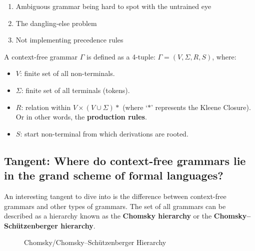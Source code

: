 \begin{enumerate}
    \item Ambiguous grammar being hard to spot with the untrained eye
    \item The dangling-else problem
    \item Not implementing precedence rules
\end{enumerate}

\begin{definition}
    A context-free grammar $\Gamma$ is defined as a 4-tuple: $\Gamma = (V, \Sigma, R, S)$, where:
    \begin{itemize}
        \item $V$: finite set of all non-terminals.
        \item $\Sigma$: finite set of all terminals (tokens).
        \item $R$: relation within $V \times (V \cup \Sigma)*$ (where `$*$' represents the Kleene Closure). Or in other words, the \textbf{production rules}.
        \item $S$: start non-terminal from which derivations are rooted.\textsuperscript{\cite{sipser_1997}}
    \end{itemize}
\end{definition}

\subsection{Tangent: Where do context-free grammars lie in the grand scheme of formal languages?}

An interesting tangent to dive into is the difference between context-free grammars and other types of grammars. The set of all grammars can be described as a hierarchy known as the \textbf{Chomsky hierarchy} or the \textbf{Chomsky–Schützenberger hierarchy}.\textsuperscript{\cite{chomsky_1956}}

\begin{figure}[h]
    \begin{center}
        \caption{\label{fig:2.2}Chomsky/Chomsky–Schützenberger Hierarchy}
    \end{center}
\end{figure}

